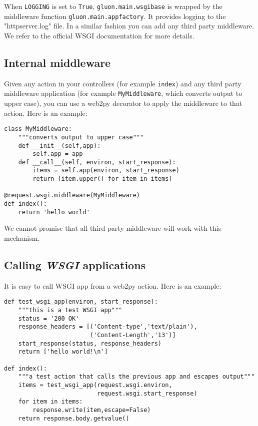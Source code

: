 \documentclass[justified,sixbynine,notoc]{tufte-book}
\def\ft{\small\tt}
\begin{document}
\begin{fullwidth}
When {\ft LOGGING} is set to {\ft True}, {\ft gluon.main.wsgibase} is wrapped by the middleware function {\ft gluon.main.appfactory}. It provides logging to the "httpserver.log" file. In a similar fashion you can add any third party middleware. We refer to the official WSGI documentation for more details.

\goodbreak\subsection{Internal middleware}

Given any action in your controllers (for example {\ft index}) and any third party middleware application (for example {\ft MyMiddleware}, which converts output to upper case), you can use a web2py decorator to apply the middleware to that action. Here is an example:
\begin{lstlisting}
class MyMiddleware:
    """converts output to upper case"""
    def __init__(self,app):
        self.app = app
    def __call__(self, environ, start_response):
        items = self.app(environ, start_response)
        return [item.upper() for item in items]

@request.wsgi.middleware(MyMiddleware)
def index():
    return 'hello world'
\end{lstlisting}

We cannot promise that all third party middleware will work with this mechanism.

\goodbreak\subsection{Calling {\it WSGI} applications}

It is easy to call WSGI app from a web2py action. Here is an example:
\begin{lstlisting}
def test_wsgi_app(environ, start_response):
    """this is a test WSGI app"""
    status = '200 OK'
    response_headers = [('Content-type','text/plain'),
                        ('Content-Length','13')]
    start_response(status, response_headers)
    return ['hello world!\n']

def index():
    """a test action that calls the previous app and escapes output"""
    items = test_wsgi_app(request.wsgi.environ,
                          request.wsgi.start_response)
    for item in items:
        response.write(item,escape=False)
    return response.body.getvalue()
\end{lstlisting}


\end{fullwidth}
\end{document}
